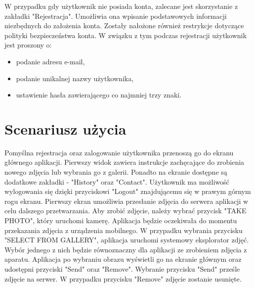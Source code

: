 {W przypadku gdy użytkownik nie posiada konta, zalecane jest skorzystanie z zakładki "Rejestracja". Umożliwia ona wpisanie podstawowych informacji niezbędnych do założenia konta. Zostały nałożone również restrykcje dotyczące polityki bezpieczeństwa konta. W związku z tym podczas rejestracji użytkownik jest proszony o:
\begin{itemize}[noitemsep]
	\item podanie adresu e-mail,
	\item podanie unikalnej nazwy użytkownika,
	\item ustawienie hasła zawierającego co najmniej trzy znaki.
\end{itemize} 
}
\newpage
\section{Scenariusz użycia}{

Pomyślna rejestracja oraz zalogowanie użytkownika przenoszą go do ekranu głównego aplikacji. Pierwszy widok zawiera instrukcje zachęcające do zrobienia nowego zdjęcia lub wybrania go z galerii. Ponadto na ekranie dostępne są dodatkowe zakładki - "History" oraz "Contact". Użytkownik ma możliwość wylogowania się dzięki przyciskowi "Logout" znajdującemu się w prawym górnym rogu ekranu. Pierwszy ekran umożliwia przesłanie zdjęcia do serwera aplikacji w celu dalszego przetwarzania. Aby zrobić zdjęcie, należy wybrać przycisk "TAKE PHOTO", który uruchomi kamerę. Aplikacja będzie oczekiwała do momentu przekazania zdjęcia z urządzenia mobilnego. W przypadku wybrania przycisku "SELECT FROM GALLERY", aplikacja uruchomi systemowy eksplorator zdjęć. Wybór jednego z nich będzie równoznaczny dla aplikacji ze zrobieniem zdjęcia z aparatu. Aplikacja po wybraniu obrazu wyświetli go na ekranie głównym oraz udostępni przyciski "Send" oraz "Remove". Wybranie przycisku "Send" prześle zdjęcie na serwer. W przypadku przycisku "Remove" zdjęcie zostanie usunięte.

}
